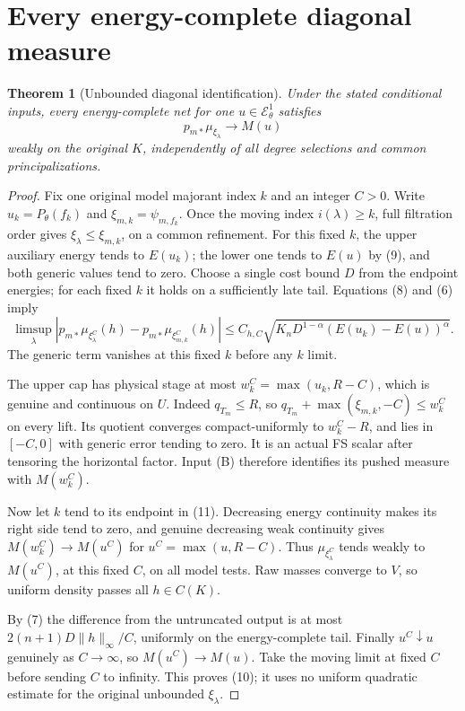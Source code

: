 \documentclass[11pt]{article}
\newtheorem{theorem}{Theorem}
\newcommand{\EE}{\mathcal E^1_\theta}
\begin{document}
\section{Every energy-complete diagonal measure}
\begin{theorem}[Unbounded diagonal identification]\label{diagonal}
Under the stated conditional inputs, every energy-complete net
for one $u\in\EE$ satisfies
\[
 p_{m*}\mu_{\xi_\lambda}\longrightarrow M(u)
                                                        \tag{10}
\]
weakly on the original $K$, independently of all degree selections
and common principalizations.
\end{theorem}
\begin{proof}
Fix one original model majorant index $k$ and an integer $C>0$.
Write $u_k=P_\theta(f_k)$ and $\xi_{m,k}=\psi_{m,f_k}$.
Once the moving index $i(\lambda)\geq k$, full filtration order gives
$\xi_\lambda\leq\xi_{m,k}$, on a common refinement.
For this fixed $k$, the upper auxiliary energy tends to $E(u_k)$;
the lower one tends to $E(u)$ by (9), and both generic values
tend to zero. Choose a single cost bound $D$ from the endpoint
energies; for each fixed $k$ it holds on a sufficiently late tail.
Equations (8) and (6) imply
\[
 \limsup_\lambda
 |p_{m*}\mu_{\xi_\lambda^C}(h)
       -p_{m*}\mu_{\xi_{m,k}^C}(h)|
 \leq C_{h,C}\sqrt{K_nD^{1-\alpha}
                        (E(u_k)-E(u))^\alpha}.          \tag{11}
\]
The generic term vanishes at this fixed $k$ before any $k$ limit.

The upper cap has physical stage at most
$w_k^C=\max(u_k,R-C)$, which is genuine and continuous on $U$.
Indeed $q_{T_m}\leq R$, so
$q_{T_m}+\max(\xi_{m,k},-C)\leq w_k^C$ on every lift.
Its quotient converges compact-uniformly to $w_k^C-R$,
and lies in $[-C,0]$ with generic error tending to zero.
It is an actual FS scalar after tensoring the horizontal factor.
Input (B) therefore identifies its pushed measure with $M(w_k^C)$.

Now let $k$ tend to its endpoint in (11).
Decreasing energy continuity makes its right side tend to zero,
and genuine decreasing weak continuity gives
$M(w_k^C)\to M(u^C)$ for $u^C=\max(u,R-C)$.
Thus $\mu_{\xi_\lambda^C}$ tends weakly to $M(u^C)$,
at this fixed $C$, on all model tests. Raw masses converge to $V$,
so uniform density passes all $h\in C(K)$.

By (7) the difference from the untruncated output is at most
$2(n+1)D\|h\|_\infty/C$, uniformly on the energy-complete tail.
Finally $u^C\downarrow u$ genuinely as $C\to\infty$,
so $M(u^C)\to M(u)$.
Take the moving limit at fixed $C$ before sending $C$ to infinity.
This proves (10); it uses no uniform quadratic estimate for
the original unbounded $\xi_\lambda$.
\end{proof}
\end{document}
